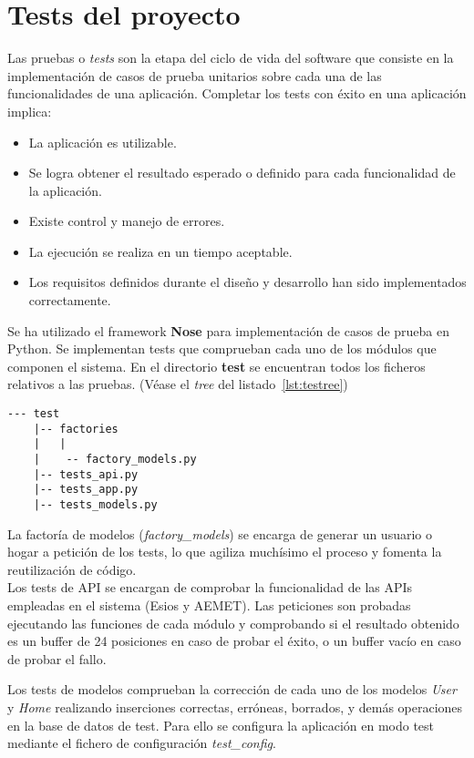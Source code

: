 \chapter{Tests del proyecto}
\label{cap:AnexoB}
Las pruebas o \textit{tests} son la etapa del ciclo de vida del software que consiste en la implementación de casos de prueba unitarios sobre cada una de las funcionalidades de una aplicación. Completar los tests con éxito en una aplicación implica:
\begin{itemize}
\item La aplicación es utilizable.
\item Se logra obtener el resultado esperado o definido para cada funcionalidad de la aplicación.
\item Existe control y manejo de errores.
\item La ejecución se realiza en un tiempo aceptable.
\item Los requisitos definidos durante el diseño y desarrollo han sido implementados correctamente.
\end{itemize}

Se ha utilizado el framework \textbf{Nose} para implementación de casos de prueba en Python. Se implementan tests que comprueban cada uno de los módulos que componen el sistema. En el directorio \textbf{test} se encuentran todos los ficheros relativos a las pruebas. (Véase el \textit{tree} del listado~\ref{lst:testree})
\begin{lstlisting}[numbers=none,caption={Estructura del directorio \textit{test}},label={lst:testree}]
 --- test
    |-- factories
    |   |
    |    -- factory_models.py
    |-- tests_api.py
    |-- tests_app.py
    |-- tests_models.py
\end{lstlisting}

La factoría de modelos (\textit{factory\_models}) se encarga de generar un usuario o hogar a petición de los tests, lo que agiliza muchísimo el proceso y fomenta la reutilización de código.\\

Los tests de API se encargan de comprobar la funcionalidad de las APIs empleadas en el sistema (Esios y AEMET). Las peticiones son probadas ejecutando las funciones de cada módulo y comprobando si el resultado obtenido es un buffer de 24 posiciones en caso de probar el éxito, o un buffer vacío en caso de probar el fallo.

Los tests de modelos comprueban la corrección de cada uno de los modelos \textit{User} y \textit{Home} realizando inserciones correctas, erróneas, borrados, y demás operaciones en la base de datos de test. Para ello se configura la aplicación en modo test mediante el fichero de configuración \textit{test\_config}.

